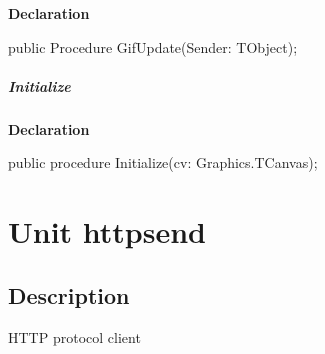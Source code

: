 \documentclass{report}
\newif\ifpdf
\begin{document}
\label{gifanimator.TGifThread-GifUpdate}
\begin{list}{}{
\setlength{\itemindent}{0cm}
\setlength{\listparindent}{0cm}
\setlength{\leftmargin}{\evensidemargin}
\addtolength{\leftmargin}{\tmplength}
\settowidth{\labelsep}{X}
\addtolength{\leftmargin}{\labelsep}
\setlength{\labelwidth}{\tmplength}
}
\item[\textbf{Declaration}\hfill]
\ifpdf
\begin{flushleft}
\fi
\begin{ttfamily}
public Procedure GifUpdate(Sender: TObject);\end{ttfamily}

\ifpdf
\end{flushleft}
\fi

\end{list}
\paragraph*{Initialize}\hspace*{\fill}

\label{gifanimator.TGifThread-Initialize}
\begin{list}{}{
\setlength{\itemindent}{0cm}
\setlength{\listparindent}{0cm}
\setlength{\leftmargin}{\evensidemargin}
\addtolength{\leftmargin}{\tmplength}
\settowidth{\labelsep}{X}
\addtolength{\leftmargin}{\labelsep}
\setlength{\labelwidth}{\tmplength}
}
\item[\textbf{Declaration}\hfill]
\ifpdf
\begin{flushleft}
\fi
\begin{ttfamily}
public procedure Initialize(cv: Graphics.TCanvas);\end{ttfamily}

\ifpdf
\end{flushleft}
\fi

\end{list}
\chapter{Unit httpsend}
\label{httpsend}
\section{Description}
HTTP protocol client\hfill\vspace*{1ex}
\end{document}
